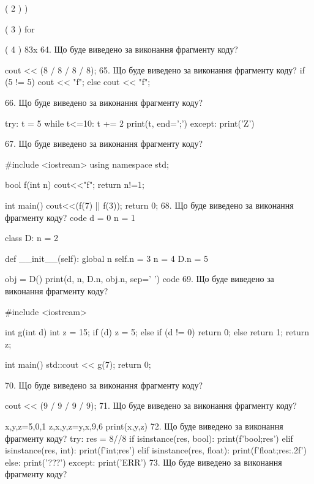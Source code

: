 \documentclass[11pt]{article}
\begin{document}
( 2 ) )

( 3 ) for

( 4 ) 83x
\vspace{5mm}
64. Що буде виведено за виконання фрагменту коду?

cout << (8 / 8 / 8 / 8);
\vspace{5mm}
65. Що буде виведено за виконання фрагменту коду?
if (5 != 5)
    cout << "f";
else
    cout << "f";

\vspace{5mm}
66. Що буде виведено за виконання фрагменту коду?

try:
    t = 5
    while t<=10:
        t += 2
    print(t, end=';')
except:
    print('Z')

\vspace{5mm}
67. Що буде виведено за виконання фрагменту коду?

#include <iostream>
using namespace std;

bool f(int n){
    cout<<"f";
    return n!=1;
}

int main(){
    cout<<(f(7) || f(3));
    return 0;
}
\vspace{5mm}
68. Що буде виведено за виконання фрагменту коду?
code
d = 0
n = 1

class D:
    n = 2
    
    def __init__(self):
global n        self.n = 3
        n = 4
        D.n = 5

obj = D()
print(d, n, D.n, obj.n, sep=' ')
code
\vspace{5mm}
69. Що буде виведено за виконання фрагменту коду?

#include <iostream>

int g(int d){
    int z = 15;
    if (d) 
        z = 5;
    else if (d != 0)
         return 0;
    else
         return 1;
    return z;
}

int main(){
    std::cout << g(7);
    return 0;
}

\vspace{5mm}
70. Що буде виведено за виконання фрагменту коду?

cout << (9 / 9 / 9 / 9);
\vspace{5mm}
71. Що буде виведено за виконання фрагменту коду?

x,y,z=5,0,1
z,x,y,z=y,x,9,6
print(x,y,z)
\vspace{5mm}
72. Що буде виведено за виконання фрагменту коду?
try:
    res = 8//8%
    if isinstance(res, bool):
        print(f'bool;{res}')
    elif isinstance(res, int):
        print(f'int;{res}')
    elif isinstance(res, float):
        print(f'float;{res:.2f}')
    else:
        print('???')
except:
    print('ERR')
\vspace{5mm}
73. Що буде виведено за виконання фрагменту коду?
\end{document}
